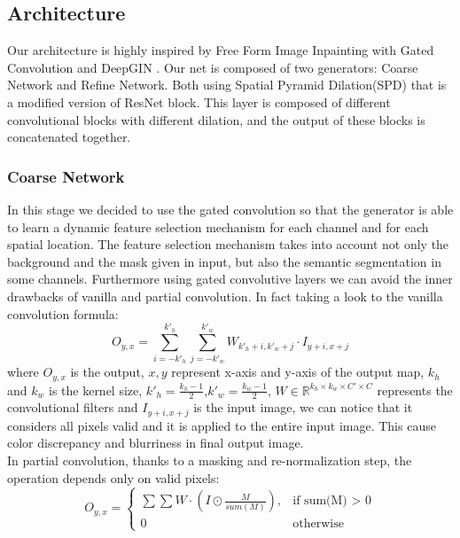 \documentclass[10pt,twocolumn,letterpaper]{article}
\begin{document}
	\subsection{Architecture}
	Our architecture is highly inspired by Free Form Image Inpainting with Gated Convolution \cite{yu2019free} and DeepGIN \cite{li2020deepgin}.
	Our net is composed of two generators: Coarse Network and Refine Network.
	Both using Spatial Pyramid Dilation(SPD) that is a modified version of ResNet block. This layer is composed of different convolutional blocks with different dilation, and the output of these blocks is concatenated together.
	
	\subsubsection{Coarse Network}
	In this stage we decided to use the gated convolution so that the generator is able to learn a dynamic feature selection mechanism for each channel and for each spatial location. The feature selection mechanism takes into account not only the background and the mask given in input, but also the semantic segmentation in some channels.
	Furthermore using gated convolutive layers we can avoid the inner drawbacks of vanilla and partial convolution. In fact taking a look to the vanilla convolution formula:
	\begin{equation}
		O_{y,x} = \sum_{i=-k'_h}^{k'_h}\sum_{j=-k'_w}^{k'_w} W_{k'_h + i, k'_w + j} \cdot I_{y + i, x + j}
	\end{equation}
	where \(O_{y,x}\) is the output, \(x,y\) represent x-axis and y-axis of the output map, \(k_h\) and \(k_w\) is the kernel size, \(k'_h = \frac{k_h - 1}{2}\),\(k'_w = \frac{k_w - 1}{2}\), \(W \in \mathbb{R}^{k_h \times k_w \times C' \times C}\) represents the convolutional filters and \(I_{y + i, x + j}\) is the input image, we can notice that it considers all pixels valid and it is applied to the entire input image. This cause color discrepancy and blurriness in final output image.
	\\
	In partial convolution, thanks to a masking and re-normalization step, the operation depends only on valid pixels:
	\begin{equation}
		O_{y,x} = \begin{cases}
			\sum \sum W \cdot (I \odot \frac{M}{sum(M)}), & \text{if sum(M) \(>\) 0} \\ 0 & \text{otherwise}
		\end{cases}
	\end{equation}
	
\end{document}

